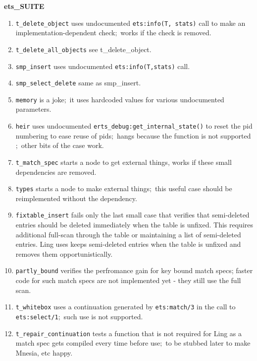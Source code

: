 \documentclass{article}
\begin{document}
\textbf{ets\_SUITE}
\begin{enumerate}
\item \texttt{t\_delete\_object} uses undocumented \verb$ets:info(T, stats)$ call to
make an implementation-dependent check$;$ works if the check is removed.
\item \texttt{t\_delete\_all\_objects} see t\_delete\_object.
\item \texttt{smp\_insert} uses undocumented \verb$ets:info(T,stats)$ call.
\item \texttt{smp\_select\_delete} same as smp\_insert.
\item \texttt{memory} is a joke$;$ it uses hardcoded values for various undocumented
parameters.
\item \texttt{heir} uses undocumented \verb$erts_debug:get_internal_state()$ to
reset the pid numbering to ease reuse of pids$;$ hangs because the function is not
supported$;$ other bits of the case work.
\item \texttt{t\_match\_spec} starts a node to get external things, works if
these small dependencies are removed.
\item \texttt{types} starts a node to make external things$;$ this useful case
should be reimplemented without the dependency.
\item \texttt{fixtable\_insert} fails only the last small case that verifies
that semi-deleted entries should be deleted immediately when the table is
unfixed. This requires additional full-scan through the table or maintaining a
list of semi-deleted entries. Ling uses keeps semi-deleted entries when the
table is unfixed and removes them opportunistically.
\item \texttt{partly\_bound} verifies the perfromance gain for key bound match
specs; faster code for such match specs are not implemented yet - they still use
the full scan.
\item \texttt{t\_whitebox} uses a continuation generated by \verb$ets:match/3$ in the
call to \verb$ets:select/1$$;$ such use is not supported.
\item \texttt{t\_repair\_continuation} tests a function that is not required for
Ling as a match spec gets compiled every time before use$;$ to be stubbed later to
make Mnesia, etc happy.
\end{enumerate}
\end{document}
